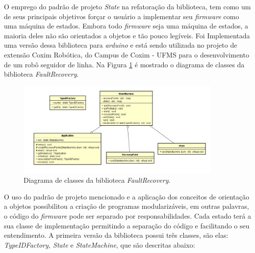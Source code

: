 O emprego do padrão de projeto \textit{State} na refatoração da biblioteca, tem como um de seus principais objetivos forçar o usuário a implementar seu \textit{firmware} como uma máquina de estados. Embora todo \textit{firmware} seja uma máquina de estados, a maioria deles não são orientados a objetos e tão pouco legíveis. Foi Implementada uma versão dessa biblioteca para \textit{arduino} e está sendo utilizada no projeto de extensão Coxim Robótica, do Campus de Coxim - UFMS para o desenvolvimento de um robô seguidor de linha. Na Figura \ref{Img:diagramaFaultRecovery} é mostrado o diagrama de classes da biblioteca \textit{FaultRecovery}.

\begin{figure}[H]
	\centering
	\includegraphics[width=0.9\textwidth]{figuras/diagramaFaultRecovery.jpg}
	\caption[Diagrama de classes da biblioteca \textit{FaultRecovery}.]{Diagrama de classes da biblioteca \textit{FaultRecovery}.}
	\label{Img:diagramaFaultRecovery}	
\end{figure}

O uso do padrão de projeto mencionado e a aplicação dos conceitos de orientação a objetos possibilitou a criação de programas modularizáveis, em outras palavras, o código do \textit{firmware} pode ser separado por responsabilidades. Cada estado terá a sua classe de implementação permitindo a separação do código e facilitando o seu entendimento. A primeira versão da biblioteca possui três classes, são elas: \textit{TypeIDFactory, State} e \textit{StateMachine}, que são descritas abaixo:

